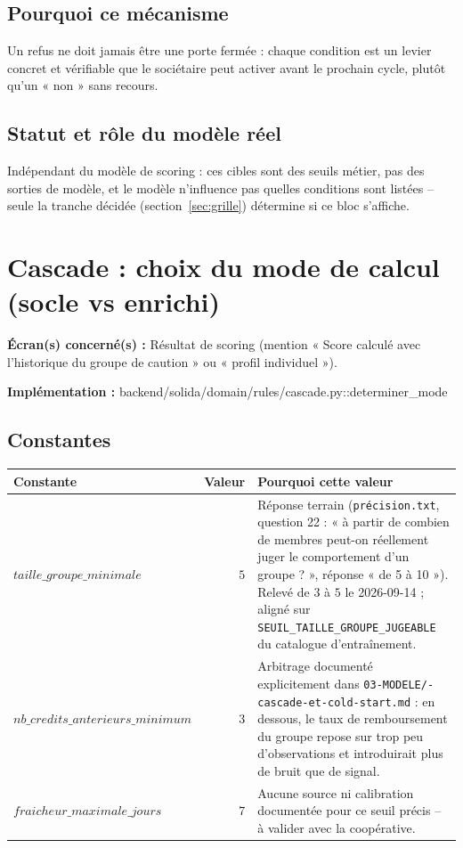 \documentclass[11pt,a4paper]{article}
\newcommand{\brk}{\allowbreak}
\newcommand{\ecran}[1]{\noindent\textbf{Écran(s) concerné(s) :} #1\par}
\newcommand{\fichier}[1]{\noindent\textbf{Implémentation :} \tiny\ttfamily#1\normalfont\normalsize\par}
\begin{document}
\subsection*{Pourquoi ce mécanisme}
Un refus ne doit jamais être une porte fermée : chaque condition est un levier concret et
vérifiable que le sociétaire peut activer avant le prochain cycle, plutôt qu'un « non » sans
recours.

\subsection*{Statut et rôle du modèle réel}
Indépendant du modèle de scoring : ces cibles sont des seuils métier, pas des sorties de modèle,
et le modèle n'influence pas quelles conditions sont listées -- seule la tranche décidée
(section~\ref{sec:grille}) détermine si ce bloc s'affiche.

\newpage

\section{Cascade : choix du mode de calcul (socle vs enrichi)}
\label{sec:cascade}

\ecran{Résultat de scoring (mention « Score calculé avec l'historique du groupe de caution » ou
« profil individuel »).}
\fichier{backend/\brk solida/\brk domain/\brk rules/\brk cascade.py::\brk{}determiner\_mode}

\subsection*{Constantes}

\begin{tabular}{@{}L{5.5cm}rL{4.6cm}@{}}
\toprule
Constante & Valeur & Pourquoi cette valeur \\
\midrule
$\mathit{taille\_groupe\_minimale}$ & $5$ & Réponse terrain (\texttt{précision.txt}, question
  22 : « à partir de combien de membres peut-on réellement juger le comportement d'un groupe ? »,
  réponse « de 5 à 10 »). Relevé de $3$ à $5$ le 2026-09-14 ; aligné sur
  \texttt{SEUIL\_TAILLE\_GROUPE\_JUGEABLE} du catalogue d'entraînement. \\
$\mathit{nb\_credits\_anterieurs\_minimum}$ & $3$ & Arbitrage documenté explicitement dans
  \texttt{03-MODELE/\brk 04-cascade-\brk et-cold-start.md} : en dessous, le taux de remboursement
  du groupe repose sur trop peu d'observations et introduirait plus de bruit que de signal. \\
$\mathit{fraicheur\_maximale\_jours}$ & $7$ & Aucune source ni calibration documentée pour ce
  seuil précis -- à valider avec la coopérative. \\
\bottomrule
\end{tabular}
\end{document}
